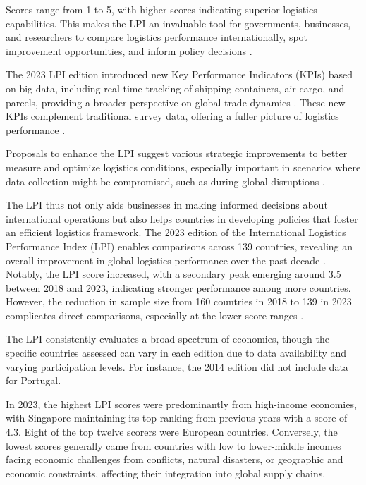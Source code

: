 \documentclass[sigconf]{acmart}
\begin{document}
Scores range from 1 to 5, with higher scores indicating superior logistics capabilities. This makes the LPI an invaluable tool for governments, businesses, and researchers to compare logistics performance internationally, spot improvement opportunities, and inform policy decisions \cite{worldbank2024}.

The 2023 LPI edition introduced new Key Performance Indicators (KPIs) based on big data, including real-time tracking of shipping containers, air cargo, and parcels, providing a broader perspective on global trade dynamics \cite{arvis2023}. These new KPIs complement traditional survey data, offering a fuller picture of logistics performance \cite{arvis2023}.

Proposals to enhance the LPI suggest various strategic improvements to better measure and optimize logistics conditions, especially important in scenarios where data collection might be compromised, such as during global disruptions \cite{rezaei2018, beysenbaev2020}.

The LPI thus not only aids businesses in making informed decisions about international operations but also helps countries in developing policies that foster an efficient logistics framework. The 2023 edition of the International Logistics Performance Index (LPI) enables comparisons across 139 countries, revealing an overall improvement in global logistics performance over the past decade \cite{arvis2023}. Notably, the LPI score increased, with a secondary peak emerging around 3.5 between 2018 and 2023, indicating stronger performance among more countries. However, the reduction in sample size from 160 countries in 2018 to 139 in 2023 complicates direct comparisons, especially at the lower score ranges \cite{arvis2023}.

The LPI consistently evaluates a broad spectrum of economies, though the specific countries assessed can vary in each edition due to data availability and varying participation levels. For instance, the 2014 edition did not include data for Portugal.

In 2023, the highest LPI scores were predominantly from high-income economies, with Singapore maintaining its top ranking from previous years with a score of 4.3. Eight of the top twelve scorers were European countries. Conversely, the lowest scores generally came from countries with low to lower-middle incomes facing economic challenges from conflicts, natural disasters, or geographic and economic constraints, affecting their integration into global supply chains.
\end{document}
